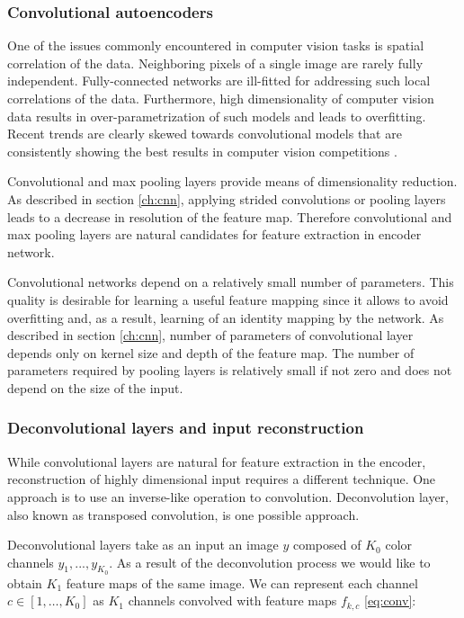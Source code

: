 \subsubsection{Convolutional autoencoders}\label{ch:cae}

One of the issues commonly encountered in computer vision tasks is spatial correlation of the data.
Neighboring pixels of a single image are rarely fully independent.
Fully-connected networks are ill-fitted for addressing such local correlations of the data.
Furthermore, high dimensionality of computer vision data results in over-parametrization of such models and leads to overfitting.
Recent trends are clearly skewed towards convolutional models \cite{He2015, Szegedy2016} that are consistently showing the best results in computer vision competitions \cite{ILSVRC15, Zhou2016}.

Convolutional and max pooling layers provide means of dimensionality reduction.
As described in section \ref{ch:cnn}, applying strided convolutions or pooling layers leads to a decrease in resolution of the feature map.
Therefore convolutional and max pooling layers are natural candidates for feature extraction in encoder network.

Convolutional networks depend on a relatively small number of parameters.
This quality is desirable for learning a useful feature mapping since it allows to avoid overfitting and, as a result, learning of an identity mapping by the network.
As described in section \ref{ch:cnn}, number of parameters of convolutional layer depends only on kernel size and depth of the feature map.
The number of parameters required by pooling layers is relatively small if not zero and does not depend on the size of the input.

\subsubsection{Deconvolutional layers and input reconstruction}

While convolutional layers are natural for feature extraction in the encoder, reconstruction of highly dimensional input requires a different technique.
One approach is to use an inverse-like operation to convolution.
Deconvolution layer, also known as transposed convolution, is one possible approach.

Deconvolutional layers \cite{Zeiler2010} take as an input an image $y$ composed of $K_0$ color channels $y_1, ... , y_{K_0}$.
As a result of the deconvolution process we would like to obtain $K_1$ feature maps of the same image.
We can represent each channel $c \in [1, \ldots, K_0]$ as $K_1$ channels convolved with feature maps $f_{k,c}$ \ref{eq:conv}:

